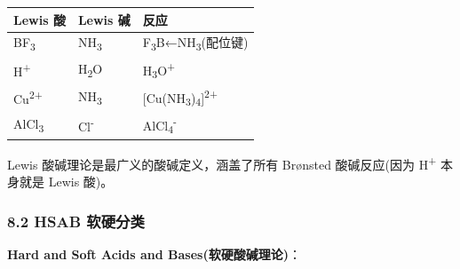 {\def\LTcaptype{none} %
\begin{longtable}[]{@{}lll@{}}
\toprule\noalign{}
Lewis 酸 & Lewis 碱 & 反应 \\
\midrule\noalign{}
\endhead
\bottomrule\noalign{}
\endlastfoot
BF\textsubscript{3} & NH\textsubscript{3} & F\textsubscript{3}B←NH\textsubscript{3}(配位键) \\
H\textsuperscript{+} & H\textsubscript{2}O & H\textsubscript{3}O\textsuperscript{+} \\
Cu\textsuperscript{2+} & NH\textsubscript{3} & {[}Cu(NH\textsubscript{3})\textsubscript{4}{]}\textsuperscript{2+} \\
AlCl\textsubscript{3} & Cl\textsuperscript{-} & AlCl\textsubscript{4}\textsuperscript{-} \\
\end{longtable}
}

Lewis 酸碱理论是最广义的酸碱定义，涵盖了所有 Brønsted 酸碱反应(因为 H\textsuperscript{+} 本身就是 Lewis 酸)。

\subsubsection{8.2 HSAB 软硬分类}\label{hsab-ux8f6fux786cux5206ux7c7b}

\textbf{Hard and Soft Acids and Bases(软硬酸碱理论)}：

